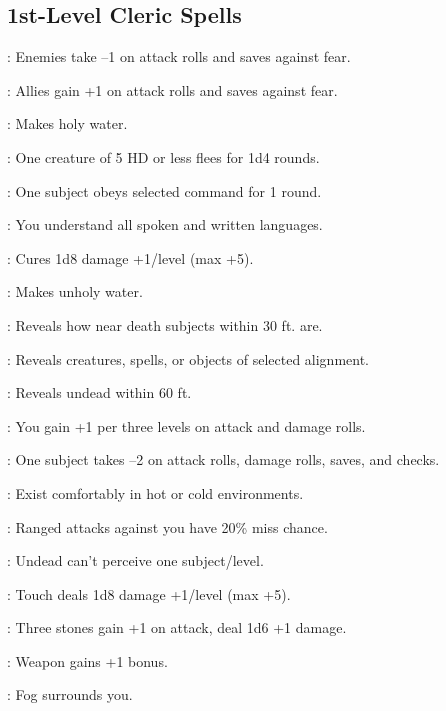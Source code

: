 \begin{multicols}{2}
\subsection{1st-Level Cleric Spells}
\begin{description*}
\item[\linkspell{Bane}:] Enemies take –1 on attack rolls and saves against fear.
\item[\linkspell{Bless}:] Allies gain +1 on attack rolls and saves against fear.
\item[\linkspell{Bless Water}:] Makes holy water.
\item[\linkspell{Cause Fear}:] One creature of 5 HD or less flees for 1d4 rounds.
\item[\linkspell{Command}:] One subject obeys selected command for 1 round.
\item[\linkspell{Comprehend Languages}:] You understand all spoken and written languages.
\item[\linkspell{Cure Light Wounds}:] Cures 1d8 damage +1/level (max +5).
\item[\linkspell{Curse Water}:] Makes unholy water.
\item[\linkspell{Deathwatch}:] Reveals how near death subjects within 30 ft. are.
\item[\linkspell{Detect Chaos/Evil/Good/Law}:] Reveals creatures, spells, or objects of selected alignment.
\item[\linkspell{Detect Undead}:] Reveals undead within 60 ft.
\item[\linkspell{Divine Favor}:] You gain +1 per three levels on attack and damage rolls.
\item[\linkspell{Doom}:] One subject takes –2 on attack rolls, damage rolls, saves, and checks.
\item[\linkspell{Endure Elements}:] Exist comfortably in hot or cold environments.
\item[\linkspell{Entropic Shield}:] Ranged attacks against you have 20\% miss chance.
\item[\linkspell{Hide from Undead}:] Undead can’t perceive one subject/level.
\item[\linkspell{Inflict Light Wounds}:] Touch deals 1d8 damage +1/level (max +5).
\item[\linkspell{Magic Stone}:] Three stones gain +1 on attack, deal 1d6 +1 damage.
\item[\linkspell{Magic Weapon}:] Weapon gains +1 bonus.
\item[\linkspell{Obscuring Mist}:] Fog surrounds you.

\end{description*}
\end{multicols}
